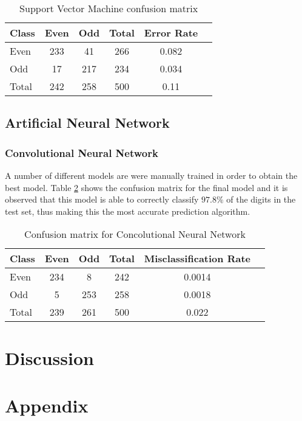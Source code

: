 \documentclass[a4paper,10pt]{article}
\begin{document}
\begin{table}[h]
\centering
\begin{tabular}{l*{4}{c}r}
  Class              & Even & Odd & Total & Error Rate\\
  \hline
  Even & 233 & 41 & 266 & 0.082 \\
  Odd & 17 & 217 & 234 & 0.034 \\
  Total & 242 & 258 & 500 & 0.11\\
\end{tabular}
\caption{Support Vector Machine confusion matrix}
\label{table:svm_conf}
\end{table}

\subsection{Artificial Neural Network}
\begin{figure}[H]
  \hfill
  \hfill
\end{figure}

\subsubsection{Convolutional Neural Network}
A number of different models are were manually trained in order to obtain the
best model. Table {\ref{table:cnn_conf}} shows the confusion matrix for the
final model and it is observed that this model is able to correctly classify
$97.8\%$ of the digits in the test set, thus making this the most accurate
prediction algorithm.



\begin{table}[h]
\centering
\begin{tabular}{l*{4}{c}r}
  Class & Even & Odd & Total & Misclassification Rate\\
  \hline
  Even & 234 & 8 & 242 & 0.0014 \\
  Odd & 5 & 253 & 258 & 0.0018\\
  Total & 239 & 261 & 500 & 0.022\\
\end{tabular}
\caption{Confusion matrix for Concolutional Neural Network}
\label{table:cnn_conf}
\end{table}



\section{Discussion}


\section{Appendix}
\begin{verbatim}


\end{verbatim}
\end{document}
